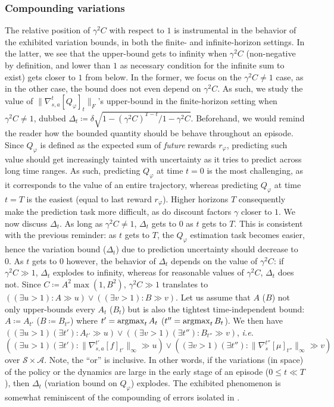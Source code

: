 \subsubsection{Compounding variations}
\label{compoundvars}

The relative position of $\gamma^2 C$ with respect to $1$ is instrumental in the
behavior of the exhibited variation bounds, in both the finite- and infinite-horizon settings.
In the latter, we see that the upper-bound gets to infinity when $\gamma^2 C$
(non-negative by definition, and lower than $1$ as necessary condition
for the infinite sum to exist) gets closer to $1$ from below.
In the former, we focus on the $\gamma^2 C \neq 1$ case, as in the other case, the
bound does not even depend on $\gamma^2 C$.
As such, we study the value of $\lVert \nabla_{s,a}^t[Q_\varphi]_t \rVert _F$'s upper-bound
in the finite-horizon setting when $\gamma^2 C \neq 1$,
dubbed $\Delta_t \coloneqq \delta\sqrt{1 - (\gamma^2 C)^{T-t} / 1 - \gamma^2 C}$.
Beforehand, we would remind the reader how the bounded quantity should be behave
throughout an episode.
Since $Q_\varphi$ is defined as the expected sum of \emph{future} rewards $r_\varphi$,
predicting such value should get increasingly tainted with uncertainty as it tries to
predict across long time ranges.
As such, predicting $Q_\varphi$ at time $t=0$ is the most challenging,
as it corresponds to the value of an entire trajectory,
whereas predicting $Q_\varphi$ at time $t=T$ is the easiest
(equal to last reward $r_\varphi$).
Higher horizons $T$ consequently make the prediction task more difficult,
as do discount factors $\gamma$ closer to $1$.
We now discuss $\Delta_t$.
As long as $\gamma^2 C \neq 1$, $\Delta_t$ gets to $0$ as $t$ gets to $T$.
This is consistent with the previous reminder:
as $t$ gets to $T$, the $Q_\varphi$ estimation task becomes easier,
hence the variation bound ($\Delta_t$) due to prediction uncertainty should decrease to $0$.
As $t$ gets to $0$ however, the behavior of $\Delta_t$ depends on the value of $\gamma^2 C$:
if $\gamma^2 C \gg 1$, $\Delta_t$ explodes to infinity, whereas
for reasonable values of $\gamma^2 C$, $\Delta_t$ does not.
Since $C \coloneqq A^2 \max(1, B^2)$, $\gamma^2 C \gg 1$ translates to
$((\exists u > 1): A \gg u) \lor ((\exists v > 1): B \gg v)$.
Let us assume that $A$ ($B$) not only upper-bounds every $A_t$ ($B_t$) but is also the tightest
time-independent bound: $A \coloneqq A_{t'}$ ($B \coloneqq B_{t''}$)
where $t' = \operatorname*{\arg\!\max}_t{A_t}$ ($t'' = \operatorname*{\arg\!\max}_t{B_t}$).
We then have
$((\exists u > 1)(\exists t'): A_{t'} \gg u)
\lor ((\exists v > 1)(\exists t''): B_{t''} \gg v)$,
\textit{i.e.}
$((\exists u > 1)(\exists t'): \lVert\nabla_{s,a}^{t'}[f]_{t'}\rVert _\infty \gg u)
\lor ((\exists v > 1)(\exists t''): \lVert\nabla_s^{t''}[\mu]_{t''}\rVert _\infty \gg v)$
over $\mathcal{S} \times \mathcal{A}$.
Note, the ``or'' is inclusive.
In other words, if the variations (in space) of the policy or the dynamics are large
in the early stage of an episode ($0 \leq t \ll T$),
then $\Delta_t$ (variation bound on $Q_\varphi$) explodes.
The exhibited phenomenon is somewhat reminiscent of the compounding of
errors isolated in \cite{Ross2010-eb}.

